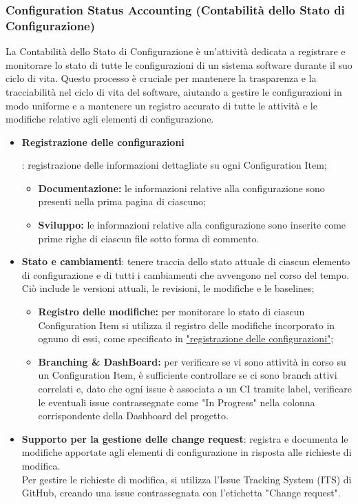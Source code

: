 \subsubsection{Configuration Status Accounting (Contabilità dello Stato di Configurazione)}
La Contabilità dello Stato di Configurazione è un'attività dedicata a registrare e monitorare lo stato di tutte le configurazioni di un sistema software durante il suo ciclo di vita. Questo processo è cruciale per mantenere la trasparenza e la tracciabilità nel ciclo di vita del software, aiutando a gestire le configurazioni in modo uniforme e a mantenere un registro accurato di tutte le attività e le modifiche relative agli elementi di configurazione.\\

\begin{itemize}
    \item \hypertarget{item:registrazioneconfigurazioni}{\textbf{Registrazione delle configurazioni}}: registrazione delle informazioni dettagliate su ogni Configuration Item;
          \begin{itemize}
              \item  \textbf{Documentazione:} le informazioni relative alla configurazione sono presenti nella prima pagina di ciascuno;
              \item  \textbf{Sviluppo:} le informazioni relative alla configurazione sono inserite come prime righe di ciascun file sotto forma di commento.
          \end{itemize}
    \item \textbf{Stato e cambiamenti}: tenere traccia dello stato attuale di ciascun elemento di configurazione e di tutti i cambiamenti che avvengono nel corso del tempo. \\
    Ciò include le versioni attuali, le revisioni, le modifiche e le baselines;
        \begin{itemize}
            \item \textbf{Registro delle modifiche:} per monitorare lo stato di ciascun Configuration Item si utilizza il registro delle modifiche incorporato in ognuno di essi, come specificato in \hyperlink{item:registrazioneconfigurazioni}{"registrazione delle configurazioni"};
            \item \textbf{Branching \& DashBoard:} per verificare se vi sono attività in corso su un Configuration Item, è sufficiente controllare se ci sono branch attivi correlati e, dato che ogni issue è associata a un CI tramite label, verificare le eventuali issue contrassegnate come "In Progress" nella colonna corrispondente della Dashboard del progetto.
        \end{itemize}
    \item \textbf{Supporto per la gestione delle change request}: registra e documenta le modifiche apportate agli elementi di configurazione in risposta alle richieste di modifica. \\
    Per gestire le richieste di modifica, si utilizza l'Issue Tracking System (ITS) di GitHub, creando una issue contrassegnata con l'etichetta "Change request".
\end{itemize}

